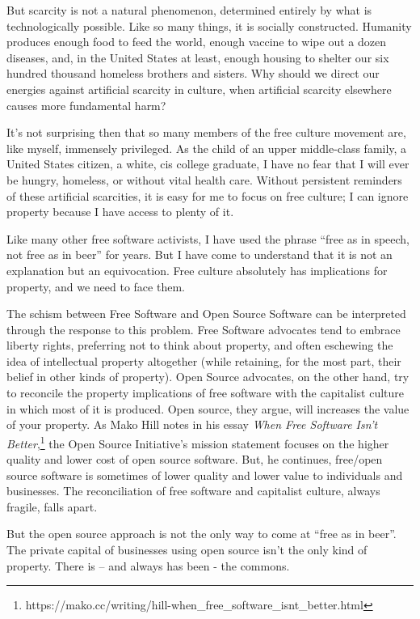 But scarcity is not a natural phenomenon, determined entirely by what is
technologically possible. Like so many things, it is socially
constructed. Humanity produces enough food to feed the world, enough
vaccine to wipe out a dozen diseases, and, in the United States at
least, enough housing to shelter our six hundred thousand homeless
brothers and sisters. Why should we direct our energies against
artificial scarcity in culture, when artificial scarcity elsewhere
causes more fundamental harm?

It's not surprising then that so many members of the free culture
movement are, like myself, immensely privileged. As the child of an
upper middle-class family, a United States citizen, a white, cis college
graduate, I have no fear that I will ever be hungry, homeless, or
without vital health care. Without persistent reminders of these
artificial scarcities, it is easy for me to focus on free culture; I can
ignore property because I have access to plenty of it.

Like many other free software activists, I have used the phrase ``free
as in speech, not free as in beer'' for years. But I have come to
understand that it is not an explanation but an equivocation. Free
culture absolutely has implications for property, and we need to face
them.

The schism between Free Software and Open Source Software can be
interpreted through the response to this problem. Free Software
advocates tend to embrace liberty rights, preferring not to think about
property, and often eschewing the idea of intellectual property
altogether (while retaining, for the most part, their belief in other
kinds of property). Open Source advocates, on the other hand, try to
reconcile the property implications of free software with the capitalist
culture in which most of it is produced. Open source, they argue, will
increases the value of your property. As Mako Hill notes in his essay
\emph{When Free Software Isn't Better},\footnote{https://mako.cc/writing/hill-when\_free\_software\_isnt\_better.html}
the Open Source Initiative's mission statement focuses on the higher
quality and lower cost of open source software. But, he continues,
free/open source software is sometimes of lower quality and lower value
to individuals and businesses. The reconciliation of free software and
capitalist culture, always fragile, falls apart.

But the open source approach is not the only way to come at ``free as in
beer''. The private capital of businesses using open source isn't the
only kind of property. There is -- and always has been - the commons.

